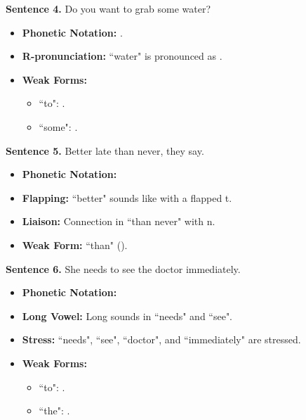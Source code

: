 \begin{description}
    \item \textbf{Sentence 4.} Do you want to grab some water?
    \begin{itemize}
        \item \textbf{Phonetic Notation:} .
        \item \textbf{R-pronunciation:} ``water" is pronounced as .
        \item \textbf{Weak Forms:}
            \begin{itemize}
                \item ``to": .
                \item ``some": .
            \end{itemize}
    \end{itemize}

    \item \textbf{Sentence 5.} Better late than never, they say.
    \begin{itemize}
        \item \textbf{Phonetic Notation:} 
        \item \textbf{Flapping:} ``better" sounds like  with a flapped t.
        \item \textbf{Liaison:} Connection in ``than never" with n.
        \item \textbf{Weak Form:} ``than" ().
    \end{itemize}

    \item \textbf{Sentence 6.} She needs to see the doctor immediately.
    \begin{itemize}
        \item \textbf{Phonetic Notation:} 
        \item \textbf{Long Vowel:} Long  sounds in ``needs" and ``see".
        \item \textbf{Stress:} ``needs", ``see", ``doctor", and ``immediately" are stressed.
        \item \textbf{Weak Forms:}
            \begin{itemize}
                \item ``to": .
                \item ``the": .
            \end{itemize}
    \end{itemize}


\end{description}
